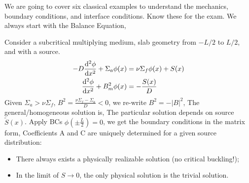 \documentclass{school-22.211-notes}
\date{March 21, 2012}
\begin{document}
\maketitle

 \label{1g-source}
We are going to cover six classical examples to understand the mechanics, boundary conditions, and interface conditions. Know these for the exam. We always start with the Balance Equation,


\clearpage
{} \label{one-group-source-problem-subcritical}
Consider a subcritical multiplying medium, slab geometry from $-L/2$ to $L/2$, and with a source. 
\begin{align}
  - D \frac{\mathrm{d}^{2}\phi}{\mathrm{d}x^{2}} + \Sigma_a \phi(x) &= \nu \Sigma_f \phi(x) + S(x) \\
  \frac{\mathrm{d}^{2}\phi}{\mathrm{d}x^{2}} + B_m^2 \phi(x) &= -\frac{S(x)}{D} 
\end{align}
Given $\Sigma_a > \nu \Sigma_f$, $B^2 = \frac{\nu \Sigma_f - \Sigma_a}{D} < 0 $, we re-write $B^2 = - |B|^2$,
The general/homogeneous solution is,
The particular solution depends on source $\tilde{S}(x)$. Apply BCs $\phi \left( \pm \frac{L}{2} \right) = 0$, we get the boundary conditions in the matrix form,
Coefficients A and C are uniquely determined for a given source distribution: 
\begin{itemize}
\item There always exists a physically realizable solution (no critical buckling!);
\item In the limit of $S\to 0$, the only physical solution is the trivial solution. 
\end{itemize}
\end{document}
